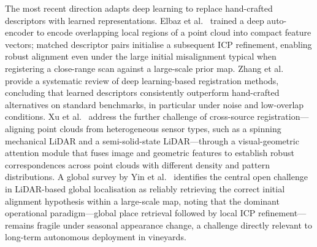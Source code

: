 The most recent direction adapts deep learning to replace hand-crafted descriptors with learned representations. Elbaz et al.~\cite{elbaz3DPointCloudRegistration2017} trained a deep auto-encoder to encode overlapping local regions of a point cloud into compact feature vectors; matched descriptor pairs initialise a subsequent ICP refinement, enabling robust alignment even under the large initial misalignment typical when registering a close-range scan against a large-scale prior map. Zhang et al.~\cite{zhangDeepLearningBased2020} provide a systematic review of deep learning-based registration methods, concluding that learned descriptors consistently outperform hand-crafted alternatives on standard benchmarks, in particular under noise and low-overlap conditions. Xu et al.~\cite{xuCross3DRegLargescaleRealworld2025} address the further challenge of cross-source registration---aligning point clouds from heterogeneous sensor types, such as a spinning mechanical LiDAR and a semi-solid-state LiDAR---through a visual-geometric attention module that fuses image and geometric features to establish robust correspondences across point clouds with different density and pattern distributions. A global survey by Yin et al.~\cite{yinSurveyGlobalLiDAR2024} identifies the central open challenge in LiDAR-based global localisation as reliably retrieving the correct initial alignment hypothesis within a large-scale map, noting that the dominant operational paradigm---global place retrieval followed by local ICP refinement---remains fragile under seasonal appearance change, a challenge directly relevant to long-term autonomous deployment in vineyards.